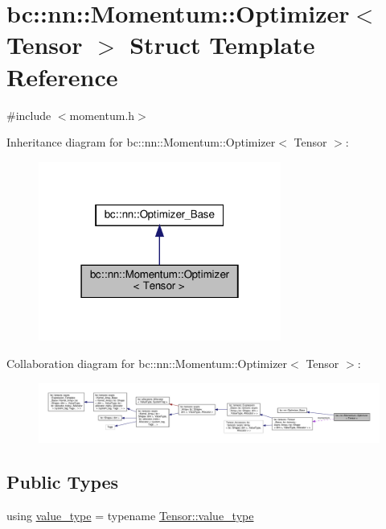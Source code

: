 \hypertarget{structbc_1_1nn_1_1Momentum_1_1Optimizer}{}\section{bc\+:\+:nn\+:\+:Momentum\+:\+:Optimizer$<$ Tensor $>$ Struct Template Reference}
\label{structbc_1_1nn_1_1Momentum_1_1Optimizer}


{\ttfamily \#include $<$momentum.\+h$>$}



Inheritance diagram for bc\+:\+:nn\+:\+:Momentum\+:\+:Optimizer$<$ Tensor $>$\+:\nopagebreak
\begin{figure}[H]
\begin{center}
\leavevmode
\includegraphics[width=226pt]{structbc_1_1nn_1_1Momentum_1_1Optimizer__inherit__graph}
\end{center}
\end{figure}


Collaboration diagram for bc\+:\+:nn\+:\+:Momentum\+:\+:Optimizer$<$ Tensor $>$\+:\nopagebreak
\begin{figure}[H]
\begin{center}
\leavevmode
\includegraphics[width=350pt]{structbc_1_1nn_1_1Momentum_1_1Optimizer__coll__graph}
\end{center}
\end{figure}
\subsection*{Public Types}
\begin{DoxyCompactItemize}
\item 
using \hyperlink{structbc_1_1nn_1_1Momentum_1_1Optimizer_a53cb161fe0dd2fa29c1647d36e424d35}{value\+\_\+type} = typename \hyperlink{classbc_1_1tensors_1_1Tensor__Base_ae7e5c0119f62f43ef74c5a463d3eaf13}{Tensor\+::value\+\_\+type}
\end{DoxyCompactItemize}
